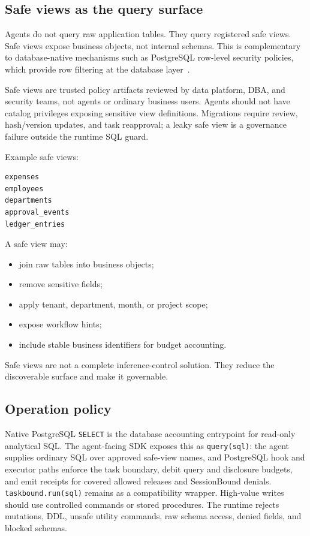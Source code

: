 \documentclass[journal]{IEEEtran}
\providecommand{\tightlist}{%
  \setlength{\itemsep}{0pt}\setlength{\parskip}{0pt}}
\begin{document}
\hypertarget{safe-views-as-the-query-surface}{%
\subsection{Safe views as the query
surface}\label{safe-views-as-the-query-surface}}

Agents do not query raw application tables. They query registered safe
views. Safe views expose business objects, not internal schemas. This is
complementary to database-native mechanisms such as PostgreSQL
row-level security policies, which provide row filtering at the database
layer~\cite{postgresql2026rowsecurity}.

Safe views are trusted policy artifacts reviewed by data platform, DBA,
and security teams, not agents or ordinary business users. Agents should
not have catalog privileges exposing sensitive view definitions.
Migrations require review, hash/version updates, and task reapproval; a
leaky safe view is a governance failure outside the runtime SQL guard.

Example safe views:

\begin{verbatim}
expenses
employees
departments
approval_events
ledger_entries
\end{verbatim}

A safe view may:

\begin{itemize}
\tightlist
\item
  join raw tables into business objects;
\item
  remove sensitive fields;
\item
  apply tenant, department, month, or project scope;
\item
  expose workflow hints;
\item
  include stable business identifiers for budget accounting.
\end{itemize}

Safe views are not a complete inference-control solution. They reduce
the discoverable surface and make it governable.

\hypertarget{operation-policy}{%
\subsection{Operation policy}\label{operation-policy}}

Native PostgreSQL \texttt{SELECT} is the database accounting entrypoint
for read-only analytical SQL. The agent-facing SDK exposes this as
\texttt{query(sql)}: the agent supplies ordinary SQL over approved
safe-view names, and PostgreSQL hook and executor paths enforce the task
boundary, debit query and disclosure budgets, and emit receipts for
covered allowed releases and SessionBound denials.
\texttt{taskbound.run(sql)} remains as a compatibility wrapper. High-value
writes should use controlled commands or stored procedures. The runtime
rejects mutations, DDL, unsafe utility commands, raw schema access,
denied fields, and blocked schemas.
\end{document}
